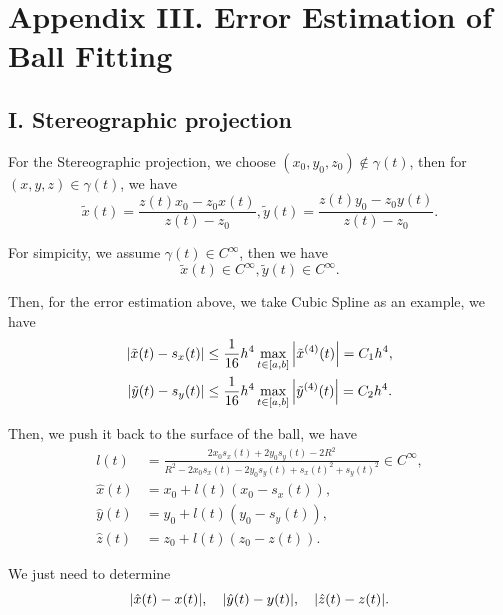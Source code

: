\documentclass[a4paper]{article}
\begin{document}
\section{Appendix III. Error Estimation of Ball Fitting}

\subsection{I. Stereographic projection}

For the Stereographic projection, we choose $(x_0, y_0, z_0) \notin \gamma (t)$, then for $(x,y,z) \in \gamma (t)$, we have
\begin{equation}
    \tilde{x}(t) = \frac{z(t) x_0 - z_0 x(t)}{z(t)-z_0}, \tilde{y}(t) = \frac{z(t) y_0 - z_0 y(t)}{z(t)-z_0}.
\end{equation}

For simpicity, we assume $\gamma (t) \in C^{\infty}$, then we have
\begin{equation}
    \tilde{x}(t) \in C^{\infty}, \tilde{y}(t) \in C^{\infty}.
\end{equation}

Then, for the error estimation above, we take Cubic Spline as an example, we have 
\begin{equation}
    \begin{aligned}
        \abs{\tilde{x}(t) - s_x(t)} &\leq \frac{1}{16} h^4 \max_{t \in [a,b]} \abs{\tilde{x}^{(4)}(t)} = C_1 h^4, \\
        \abs{\tilde{y}(t) - s_y(t)} &\leq \frac{1}{16} h^4 \max_{t \in [a,b]} \abs{\tilde{y}^{(4)}(t)} = C_2 h^4.
    \end{aligned}
\end{equation}

Then, we push it back to the surface of the ball, we have
\begin{equation}
    \begin{aligned}
        l(t) &= \frac{2x_0 s_x(t)+2y_0 s_y(t) - 2 R^2}{R^2 - 2x_0 s_x(t) - 2y_0 s_y(t) + s_x(t)^2 + s_y(t)^2} \in C^{\infty}, \\
        \hat{x}(t) &= x_0 + l(t) (x_0 - s_x(t)), \\
        \hat{y}(t) &= y_0 + l(t) (y_0 - s_y(t)), \\
        \hat{z}(t) &= z_0 + l(t) (z_0 - z(t)).
    \end{aligned}
\end{equation}

We just need to determine 
\begin{equation}
    \abs{\hat{x}(t) - x(t)}, \quad \abs{\hat{y}(t) - y(t)}, \quad \abs{\hat{z}(t) - z(t)}.
\end{equation}
\end{document}
